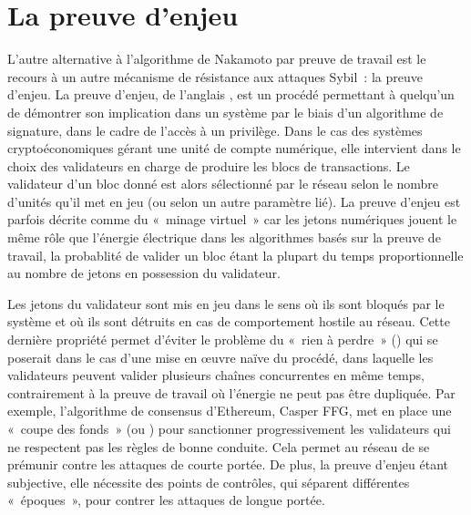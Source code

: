 \section*{La preuve d'enjeu}

L'autre alternative à l'algorithme de Nakamoto par preuve de travail est le recours à un autre mécanisme de résistance aux attaques Sybil~: la preuve d'enjeu. La preuve d'enjeu, de l'anglais , est un procédé permettant à quelqu'un de démontrer son implication dans un système par le biais d'un algorithme de signature, dans le cadre de l'accès à un privilège. Dans le cas des systèmes cryptoéconomiques gérant une unité de compte numérique, elle intervient dans le choix des validateurs en charge de produire les blocs de transactions. Le validateur d'un bloc donné est alors sélectionné par le réseau selon le nombre d'unités qu'il met en jeu (ou selon un autre paramètre lié). La preuve d'enjeu est parfois décrite comme du «~minage virtuel~» car les jetons numériques jouent le même rôle que l'énergie électrique dans les algorithmes basés sur la preuve de travail, la probablité de valider un bloc étant la plupart du temps proportionnelle au nombre de jetons en possession du validateur.

Les jetons du validateur sont mis en jeu dans le sens où ils sont bloqués par le système et où ils sont détruits en cas de comportement hostile au réseau. Cette dernière propriété permet d'éviter le problème du «~rien à perdre~» () qui se poserait dans le cas d'une mise en œuvre naïve du procédé, dans laquelle les validateurs peuvent valider plusieurs chaînes concurrentes en même temps, contrairement à la preuve de travail où l'énergie ne peut pas être dupliquée. Par exemple, l'algorithme de consensus d'Ethereum, Casper FFG, met en place une «~coupe des fonds~» (ou ) pour sanctionner progressivement les validateurs qui ne respectent pas les règles de bonne conduite. Cela permet au réseau de se prémunir contre les attaques de courte portée. De plus, la preuve d'enjeu étant subjective, elle nécessite des points de contrôles, qui séparent différentes «~époques~», pour contrer les attaques de longue portée.

